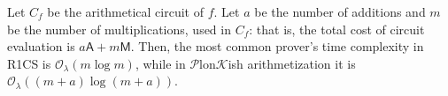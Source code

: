 \documentclass{iacrtrans}
\begin{document}
\begin{theorem}
    Let $C_f$ be the arithmetical circuit of $f$. Let $a$ be the number of
    additions and $m$ be the number of multiplications, used in $C_f$: that is,
    the total cost of circuit evaluation is $a\mathsf{A} + m\mathsf{M}$. Then,
    the most common prover's time complexity in R1CS is
    $\mathcal{O}_{\lambda}(m\log m)$, while in $\mathcal{P}$lon$\mathcal{K}$ish
    arithmetization it is $\mathcal{O}_{\lambda}((m+a)\log(m+a))$.
\end{theorem}



\end{document}
